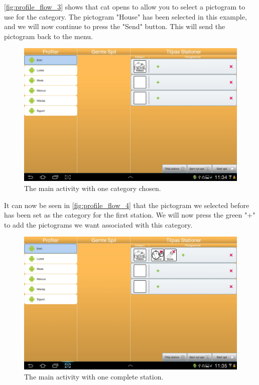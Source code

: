 \autoref{fig:profile_flow_3} shows that \ac{cat} opens to allow you to select a pictogram to use for the category.
The pictogram "House" has been selected in this example, and we will now continue to press the "Send" button. This will send the pictogram back to the menu.

\begin{figure}[H]
\centering
\includegraphics[width=1.0\linewidth]{img/screenshots/profile_flow_4.jpg}%
\caption{The main activity with one category chosen.}
\label{fig:profile_flow_4}
\end{figure}

It can now be seen in \autoref{fig:profile_flow_4} that the pictogram we selected before has been set as the category for the first station. We will now press the green "+" to add the pictograms we want associated with this category.

\begin{figure}[H]
\centering
\includegraphics[width=1.0\linewidth]{img/screenshots/profile_flow_5.jpg}%
\caption{The main activity with one complete station.}
\label{fig:profile_flow_5}
\end{figure}

